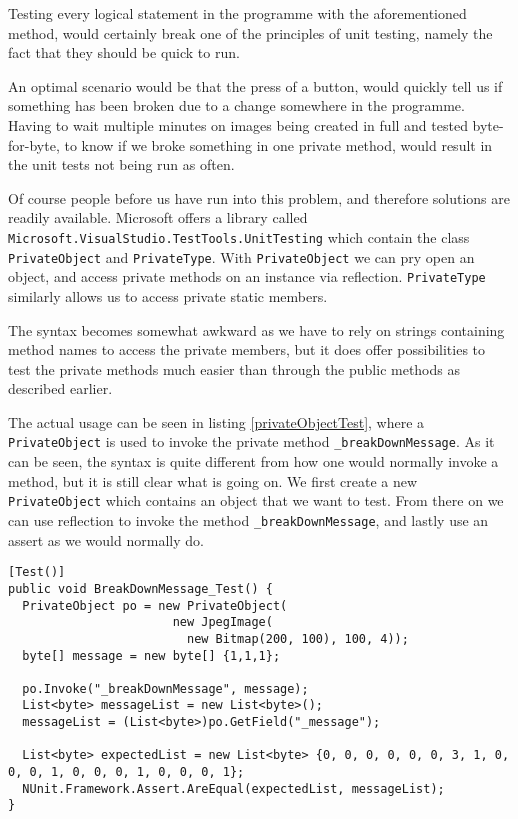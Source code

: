 Testing every logical statement in the programme with the aforementioned method, would certainly break one of the principles of unit testing, namely the fact that they should be quick to run.

An optimal scenario would be that the press of a button, would quickly tell us if something has been broken due to a change somewhere in the programme. 
Having to wait multiple minutes on images being created in full and tested byte-for-byte, to know if we broke something in one private method, would result in the unit tests not being run as often. 

Of course people before us have run into this problem, and therefore solutions are readily available.
Microsoft offers a library called \lstinline|Microsoft.VisualStudio.TestTools.UnitTesting| which contain the class \lstinline|PrivateObject| and \lstinline|PrivateType|.
With \lstinline|PrivateObject| we can pry open an object, and access private methods on an instance via reflection.
\lstinline|PrivateType| similarly allows us to access private static members. 

The syntax becomes somewhat awkward as we have to rely on strings containing method names to access the private members, but it does offer possibilities to test the private methods much easier than through the public methods as described earlier.

The actual usage can be seen in listing \ref{privateObjectTest}, where a \lstinline|PrivateObject| is used to invoke the private method \lstinline|_breakDownMessage|.
As it can be seen, the syntax is quite different from how one would normally invoke a method, but it is still clear what is going on.
We first create a new \lstinline|PrivateObject| which contains an object that we want to test.
From there on we can use reflection to invoke the method \lstinline|_breakDownMessage|, and lastly use an assert as we would normally do.

\begin{lstlisting}[firstnumber=23,label=privateObjectTest,caption={Example usage of the \lstinline|PrivateObject| class \textbf{File: }JPEGImageTests.cs}]
[Test()]
public void BreakDownMessage_Test() {
  PrivateObject po = new PrivateObject(
                       new JpegImage(
                         new Bitmap(200, 100), 100, 4));
  byte[] message = new byte[] {1,1,1};

  po.Invoke("_breakDownMessage", message);
  List<byte> messageList = new List<byte>();
  messageList = (List<byte>)po.GetField("_message");

  List<byte> expectedList = new List<byte> {0, 0, 0, 0, 0, 0, 3, 1, 0, 0, 0, 1, 0, 0, 0, 1, 0, 0, 0, 1};
  NUnit.Framework.Assert.AreEqual(expectedList, messageList);
}
\end{lstlisting}

